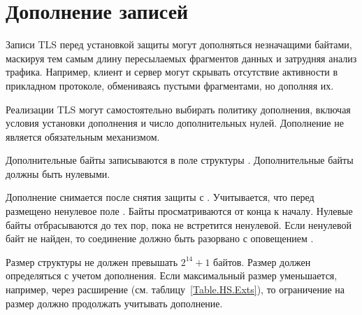 \section{Дополнение записей}\label{RECORD.Pad}

Записи TLS перед установкой защиты могут дополняться незначащими байтами, 
маскируя тем самым длину пересылаемых фрагментов данных и затрудняя анализ 
трафика. Например, клиент и сервер могут скрывать отсутствие активности в 
прикладном протоколе, обмениваясь пустыми фрагментами, но дополняя их.

Реализации TLS могут самостоятельно выбирать политику дополнения, включая 
условия установки дополнения и число дополнительных нулей. Дополнение не 
является обязательным механизмом.

Дополнительные байты записываются в поле  структуры 
. Дополнительные байты должны быть нулевыми.

Дополнение снимается после снятия защиты с . 
Учитывается, что перед  размещено ненулевое поле .
Байты  просматриваются от конца к началу. Нулевые байты 
отбрасываются до тех пор, пока не встретится ненулевой.
%
Если ненулевой байт не найден, то соединение должно быть разорвано с 
оповещением .

Размер структуры  не должен превышать $2^{14}+1$ байтов. 
Размер должен определяться с учетом дополнения.
%
Если максимальный размер  уменьшается, например, через 
расширение  (см. 
таблицу~\ref{Table.HS.Exts}), то ограничение на размер должно продолжать 
учитывать дополнение.

